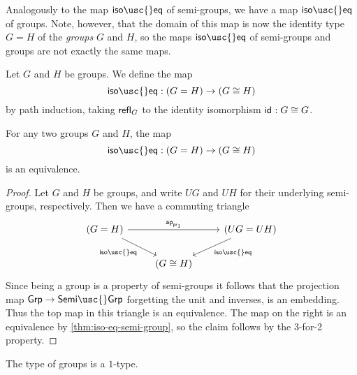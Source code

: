 Analogously to the map $\mathsf{iso\usc{}eq}$ of semi-groups, we have a map $\mathsf{iso\usc{}eq}$ of groups. Note, however, that the domain of this map is now the identity type $G=H$ of the \emph{groups} $G$ and $H$, so the maps $\mathsf{iso\usc{}eq}$ of semi-groups and groups are not exactly the same maps.

\begin{defn}
  Let $G$ and $H$ be groups. We define the map
  \begin{equation*}
    \mathsf{iso\usc{}eq} : (G=H)\to (G\cong H)
  \end{equation*}
  by path induction, taking $\mathsf{refl}_{G}$ to the identity isomorphism $\mathsf{id}_{}:G\cong G$.
\end{defn}

\begin{thm}
  For any two groups $G$ and $H$, the map
  \begin{equation*}
    \mathsf{iso\usc{}eq}:(G=H)\to (G\cong H)
  \end{equation*}
  is an equivalence.
\end{thm}

\begin{proof}
  Let $G$ and $H$ be groups, and write $UG$ and $UH$ for their underlying semi-groups, respectively. Then we have a commuting triangle
  \begin{equation*}
    \begin{tikzcd}
      (G=H) \arrow[rr,"\apfunc{\proj 1}"] \arrow[dr,swap,"\mathsf{iso\usc{}eq}"] & & (UG=UH) \arrow[dl,"\mathsf{iso\usc{}eq}"] \\
      & (G\cong H)
    \end{tikzcd}
  \end{equation*}
  Since being a group is a property of semi-groups it follows that the projection map $\mathsf{Grp}\to\mathsf{Semi\usc{}Grp}$ forgetting the unit and inverses, is an embedding. Thus the top map in this triangle is an equivalence. The map on the right is an equivalence by \cref{thm:iso-eq-semi-group}, so the claim follows by the 3-for-2 property.
\end{proof}

\begin{cor}
  The type of groups is a $1$-type.
\end{cor}

